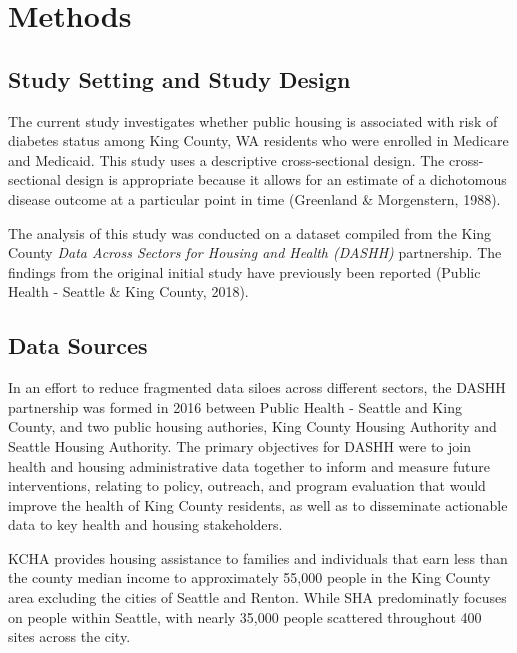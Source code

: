 \documentclass [11pt, proquest] {uwthesis}[2015/03/03]
\begin{document}
\chapter{Methods}\label{methods}

\section{Study Setting and Study
Design}\label{study-setting-and-study-design}

The current study investigates whether public housing is associated with
risk of diabetes status among King County, WA residents who were
enrolled in Medicare and Medicaid. This study uses a descriptive
cross-sectional design. The cross-sectional design is appropriate
because it allows for an estimate of a dichotomous disease outcome at a
particular point in time (Greenland \& Morgenstern, 1988).

The analysis of this study was conducted on a dataset compiled from the
King County \emph{Data Across Sectors for Housing and Health (DASHH)}
partnership. The findings from the original initial study have
previously been reported (Public Health - Seattle \& King County, 2018).

\section{Data Sources}\label{data-sources}

In an effort to reduce fragmented data siloes across different sectors,
the DASHH partnership was formed in 2016 between Public Health - Seattle
and King County, and two public housing authories, King County Housing
Authority and Seattle Housing Authority. The primary objectives for
DASHH were to join health and housing administrative data together to
inform and measure future interventions, relating to policy, outreach,
and program evaluation that would improve the health of King County
residents, as well as to disseminate actionable data to key health and
housing stakeholders.

KCHA provides housing assistance to families and individuals that earn
less than the county median income to approximately 55,000 people in the
King County area excluding the cities of Seattle and Renton. While SHA
predominatly focuses on people within Seattle, with nearly 35,000 people
scattered throughout 400 sites across the city.
\end{document}
